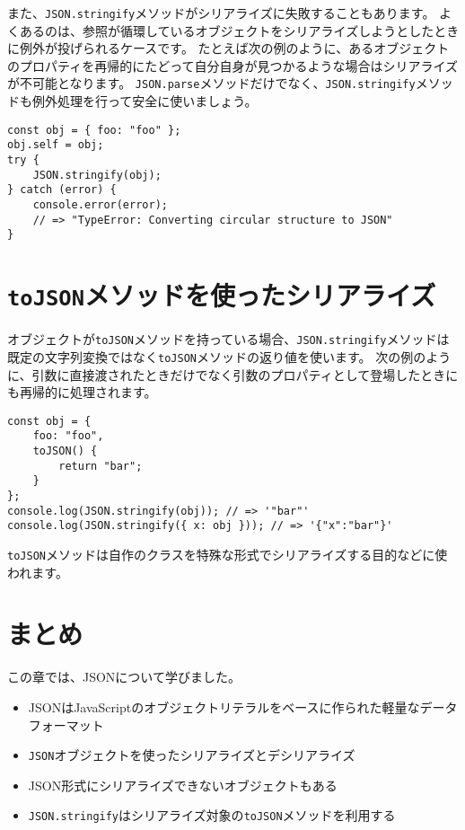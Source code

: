 また、\texttt{JSON.stringify}メソッドがシリアライズに失敗することもあります。
よくあるのは、参照が循環しているオブジェクトをシリアライズしようとしたときに例外が投げられるケースです。
たとえば次の例のように、あるオブジェクトのプロパティを再帰的にたどって自分自身が見つかるような場合はシリアライズが不可能となります。
\texttt{JSON.parse}メソッドだけでなく、\texttt{JSON.stringify}メソッドも例外処理を行って安全に使いましょう。

\begin{lstlisting}
const obj = { foo: "foo" };
obj.self = obj;
try {
    JSON.stringify(obj);
} catch (error) {
    console.error(error); 
    // => "TypeError: Converting circular structure to JSON"
}
\end{lstlisting}

\hypertarget{serialization-by-toJSON}{%
\section{\texorpdfstring{\texttt{toJSON}メソッドを使ったシリアライズ}{toJSONメソッドを使ったシリアライズ}}\label{serialization-by-toJSON}}

オブジェクトが\texttt{toJSON}メソッドを持っている場合、\texttt{JSON.stringify}メソッドは既定の文字列変換ではなく\texttt{toJSON}メソッドの返り値を使います。
次の例のように、引数に直接渡されたときだけでなく引数のプロパティとして登場したときにも再帰的に処理されます。

\begin{lstlisting}
const obj = {
    foo: "foo",
    toJSON() {
        return "bar";
    }
};
console.log(JSON.stringify(obj)); // => '"bar"'
console.log(JSON.stringify({ x: obj })); // => '{"x":"bar"}'
\end{lstlisting}

\texttt{toJSON}メソッドは自作のクラスを特殊な形式でシリアライズする目的などに使われます。

\hypertarget{conclusion}{%
\section{まとめ}\label{conclusion}}

この章では、JSONについて学びました。

\begin{itemize}
\item
  JSONはJavaScriptのオブジェクトリテラルをベースに作られた軽量なデータフォーマット
\item
  \texttt{JSON}オブジェクトを使ったシリアライズとデシリアライズ
\item
  JSON形式にシリアライズできないオブジェクトもある
\item
  \texttt{JSON.stringify}はシリアライズ対象の\texttt{toJSON}メソッドを利用する
\end{itemize}
